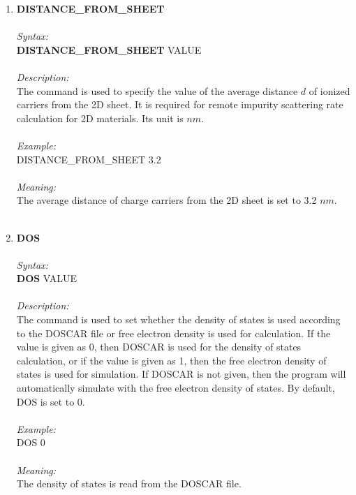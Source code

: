 \documentclass[12pt]{article}
\begin{document}
\begin{enumerate}
    \item \textbf{DISTANCE\_FROM\_SHEET} \\ \\
    \textit{Syntax:} \\
    \textbf{DISTANCE\_FROM\_SHEET} VALUE \\ \\
    \textit{Description:} \\
    The command is used to specify the value of the average distance $d$ of ionized carriers from the 2D sheet. It is required for remote impurity scattering rate calculation for 2D materials. Its unit is $nm$. \\ \\
    \textit{Example:} \\
    DISTANCE\_FROM\_SHEET 3.2 \\ \\
    \textit{Meaning:} \\    
    The average distance of charge carriers from the 2D sheet is set to 3.2 $nm$. \\ \\
    
    \item \textbf{DOS}  \\ \\
    \textit{Syntax:} \\
    \textbf{DOS} VALUE \\ \\ 
    \textit{Description:} \\
    The command is used to set whether the density of states is used according to the DOSCAR file or free electron density is used for calculation. If the value is given as 0, then DOSCAR is used for the density of states calculation, or if the value is given as 1, then the free electron density of states is used for simulation. If DOSCAR is not given, then the program will automatically simulate with the free electron density of states. By default, DOS is set to 0. \\ \\
    \textit{Example:} \\
    DOS 0 \\ \\
    \textit{Meaning:} \\    
    The density of states is read from the DOSCAR file. \\ \\
    

\end{enumerate}
\end{document}
